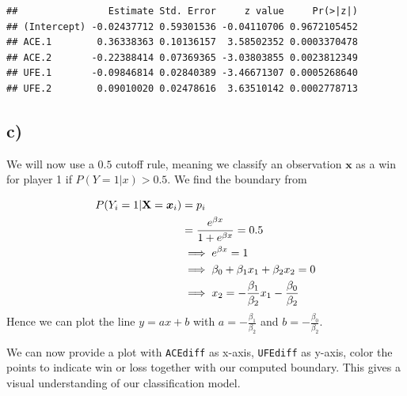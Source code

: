 \documentclass[
]{article}
\begin{document}
\begin{verbatim}
##                Estimate Std. Error     z value     Pr(>|z|)
## (Intercept) -0.02437712 0.59301536 -0.04110706 0.9672105452
## ACE.1        0.36338363 0.10136157  3.58502352 0.0003370478
## ACE.2       -0.22388414 0.07369365 -3.03803855 0.0023812349
## UFE.1       -0.09846814 0.02840389 -3.46671307 0.0005268640
## UFE.2        0.09010020 0.02478616  3.63510142 0.0002778713
\end{verbatim}

\hypertarget{c-2}{%
\subsection{c)}\label{c-2}}

We will now use a \(0.5\) cutoff rule, meaning we classify an
observation \(\boldsymbol{x}\) as a win for player 1 if
\(P(Y = 1 | x) > 0.5\). We find the boundary from

\[
\begin{aligned}
P(Y_i = 1| {\bf X}={\boldsymbol{x}}_i) &= p_i \\
&= \frac{e^{\beta x}}{ 1+ e^{\beta x}} = 0.5 \\
&\implies e^{\beta x} = 1 \\   
&\implies \beta_0 + \beta_1 x_{1} + \beta_2 x_{2} = 0 \\
&\implies x_2 = -\frac{\beta_1}{\beta_2}x_1 - \frac{\beta_0}{\beta_2}
\end{aligned}
\] Hence we can plot the line \(y = ax + b\) with
\(a = -\frac{\beta_1}{\beta_2}\) and \(b = -\frac{\beta_0}{\beta_2}\).

We can now provide a plot with \texttt{ACEdiff} as x-axis,
\texttt{UFEdiff} as y-axis, color the points to indicate win or loss
together with our computed boundary. This gives a visual understanding
of our classification model.
\end{document}
